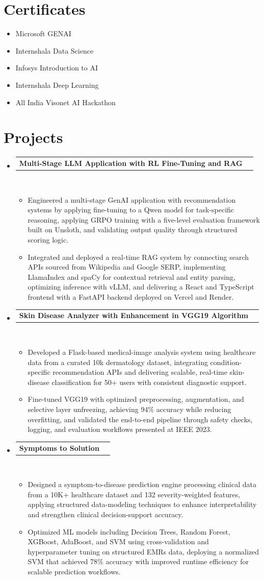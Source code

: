 \documentclass[letterpaper,11pt]{article}
\newcommand{\resumeItem}[1]{\item\small{{#1 \vspace{-3pt}}}}
\newcommand{\resumeProjectHeading}[2]{
    \vspace{-3pt}\item
    \begin{tabularx}{0.995\textwidth}[t]{Xr}
      \small\textbf{#1} & #2 \\
    \end{tabularx}\\[-3pt]
    \vspace{3pt}
}
\newcommand{\resumeItemListStart}{\begin{itemize}}
\newcommand{\resumeItemListEnd}{\end{itemize}\vspace{-4pt}}
\newcommand{\resumeSubHeadingListStart}{
  \begin{itemize}[leftmargin=0.12in, label={}]
  \setlength{\itemsep}{0pt}
  \setlength{\parsep}{0pt}
  \setlength{\parskip}{0pt}
}
\newcommand{\resumeSubHeadingListEnd}{\end{itemize}}
\begin{document}
\section{Certificates}
\vspace{-4pt}
\resumeItemListStart
\resumeItem{Microsoft GENAI}
\resumeItem{Internshala Data Science}
\resumeItem{Infosys Introduction to AI}
\resumeItem{Internshala Deep Learning}
\resumeItem{All India Visonet AI Hackathon}
\resumeItemListEnd

\section{Projects}
\vspace{-4pt}
\resumeSubHeadingListStart

\resumeProjectHeading{Multi-Stage LLM Application with RL Fine-Tuning and RAG}{}
\resumeItemListStart
\resumeItem{Engineered a multi-stage GenAI application with recommendation systems by applying fine-tuning to a Qwen model for task-specific reasoning, applying GRPO training with a five-level evaluation framework built on Unsloth, and validating output quality through structured scoring logic.}
\resumeItem{Integrated and deployed a real-time RAG system by connecting search APIs sourced from Wikipedia and Google SERP, implementing LlamaIndex and spaCy for contextual retrieval and entity parsing, optimizing inference with vLLM, and delivering a React and TypeScript frontend with a FastAPI backend deployed on Vercel and Render.}
\resumeItemListEnd

\resumeProjectHeading{Skin Disease Analyzer with Enhancement in VGG19 Algorithm}{}
\resumeItemListStart
\resumeItem{Developed a Flask-based medical-image analysis system using healthcare data from a curated 10k dermatology dataset, integrating condition-specific recommendation APIs and delivering scalable, real-time skin-disease classification for 50+ users with consistent diagnostic support.}
\resumeItem{Fine-tuned VGG19 with optimized preprocessing, augmentation, and selective layer unfreezing, achieving 94\% accuracy while reducing overfitting, and validated the end-to-end pipeline through safety checks, logging, and evaluation workflows presented at IEEE 2023.}
\resumeItemListEnd

\resumeProjectHeading{Symptoms to Solution}{}
\resumeItemListStart
\resumeItem{Designed a symptom-to-disease prediction engine processing clinical data from a 10K+ healthcare dataset and 132 severity-weighted features, applying structured data-modeling techniques to enhance interpretability and strengthen clinical decision-support accuracy.}
\resumeItem{Optimized ML models including Decision Trees, Random Forest, XGBoost, AdaBoost, and SVM using cross-validation and hyperparameter tuning on structured EMRs data, deploying a normalized SVM that achieved 78\% accuracy with improved runtime efficiency for scalable prediction workflows.}
\resumeItemListEnd

\resumeSubHeadingListEnd
\end{document}
